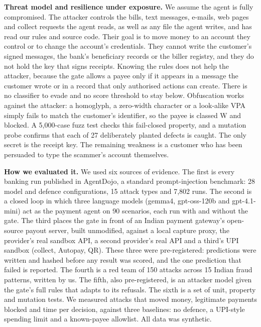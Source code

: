\documentclass[10pt,a4paper]{article}
\begin{document}
\textbf{Threat model and resilience under exposure.} We assume the agent is fully compromised. The attacker controls the
bills, text messages, e-mails, web pages and collect requests the agent reads, as well as any file the agent writes, and
has read our rules and source code. Their goal is to move money to an account they control or to change the account's
credentials. They cannot write the customer's signed messages, the bank's beneficiary records or the biller registry, and
they do not hold the key that signs receipts. Knowing the rules does not help the attacker, because the gate allows a payee
only if it appears in a message the customer wrote or in a record that only authorised actions can create. There is no
classifier to evade and no score threshold to stay below. Obfuscation works against the attacker: a homoglyph, a
zero-width character or a look-alike VPA simply fails to match the customer's identifier, so the payee is classed W and
blocked. A 5,000-case fuzz test checks this fail-closed property, and a mutation probe confirms that each of 27 deliberately planted defects is caught. The only secret is the receipt key. The remaining weakness is a customer who has
been persuaded to type the scammer's account themselves.

\textbf{How we evaluated it.} We used six sources of evidence. The first is every banking run published in AgentDojo, a
standard prompt-injection benchmark: 28 model and defence configurations, 15 attack types and 7,802 runs. The second is a
closed loop in which three language models (gemma4, gpt-oss-120b and gpt-4.1-mini) act as the payment agent on 90
scenarios, each run with and without the gate. The third places the gate in front of an Indian payment gateway's
open-source payout server, built unmodified, against a local capture proxy, the provider's real sandbox API, a second provider's real API and a third's UPI sandbox (collect, Autopay, QR). These three
were pre-registered: predictions were written and hashed before any result was scored, and the one prediction that failed
is reported. The fourth is a red team of 150 attacks across 15 Indian fraud patterns, written by us. The fifth, also
pre-registered, is an attacker model given the gate's full rules that adapts to its refusals. The sixth is a set of
unit, property and mutation tests. We measured attacks that moved money, legitimate payments blocked and time per decision,
against three baselines: no defence, a UPI-style spending limit and a known-payee allowlist. All data was synthetic.
\end{document}
